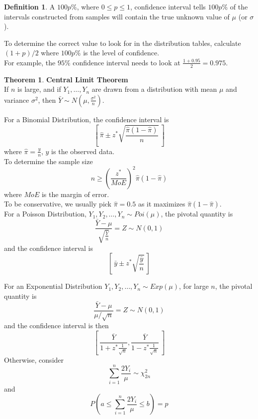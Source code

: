 \documentclass[12pt, leqno]{article}
\theoremstyle{definition}
\newtheorem*{defn}{Definition}
\newtheorem*{theorem}{Theorem}
\begin{document}
  \begin{defn}
    A $100p\%$, where $0 \leq p \leq 1$, confidence interval tells $100p\%$ of the intervals constructed from samples will contain the true unknown value of $\mu$ (or $\sigma$).
  \end{defn}

  To determine the correct value to look for in the distribution tables, calculate $(1+p)/2$ where $100p\%$ is the level of confidence. \\
  For example, the $95\%$ confidence interval needs to look at $\frac{1+0.95}{2} = 0.975$.

  \begin{theorem}
  \textbf{Central Limit Theorem} \\
    If $n$ is large, and if $Y_{1}, \dots, Y_{n}$ are drawn from a distribution with mean $\mu$ and variance $\sigma^{2}$, then $\bar{Y} \sim N\left(\mu, \frac{\sigma^{2}}{n}\right)$.
  \end{theorem}

  For a Binomial Distribution, the confidence interval is
  $$\left[~\hat{\pi} \pm z^{*}\sqrt{\frac{\hat{\pi}(1 - \hat{\pi})}{n}}~\right]$$
  where $\hat{\pi} = \frac{y}{n}$, $y$ is the observed data. \\
  To determine the sample size
  $$n \geq \left(\frac{z^{*}}{MoE}\right)^{2}\hat{\pi}(1 - \hat{\pi})$$
  where $MoE$ is the margin of error. \\
  To be conservative, we usually pick $\hat{\pi} = 0.5$ as it maximizes $\hat{\pi}(1 - \hat{\pi})$. \\

  For a Poisson Distribution, $Y_1, Y_2, \dots, Y_n \sim Poi(\mu)$, the pivotal quantity is
  $$\frac{\bar{Y} - \mu}{\sqrt{\frac{\bar{Y}}{n}}} = Z \sim N(0,1)$$
  and the confidence interval is
  $$\left[~\bar{y} \pm z^{*}\sqrt{\frac{\bar{y}}{n}}~\right]$$

  For an Exponential Distribution $Y_1, Y_2, \dots, Y_n \sim Exp(\mu)$, for large $n$, the pivotal quantity is
  $$\frac{\bar{Y} - \mu}{\mu / \sqrt{n}} = Z \sim N(0, 1)$$
  and the confidence interval is then
  $$\left[~ \frac{\bar{Y}}{1 + z^{*}\frac{1}{\sqrt{n}}}, \frac{\bar{Y}}{1 - z^{*}\frac{1}{\sqrt{n}}} ~\right]$$
  Otherwise, consider
  $$\sum_{i=1}^{n}\frac{2Y_{i}}{\mu} \sim \chi_{2n}^{2}$$
  and
  $$P\left(a \leq \sum_{i=1}^{n}\frac{2Y_{i}}{\mu} \leq b\right) = p$$
\end{document}
